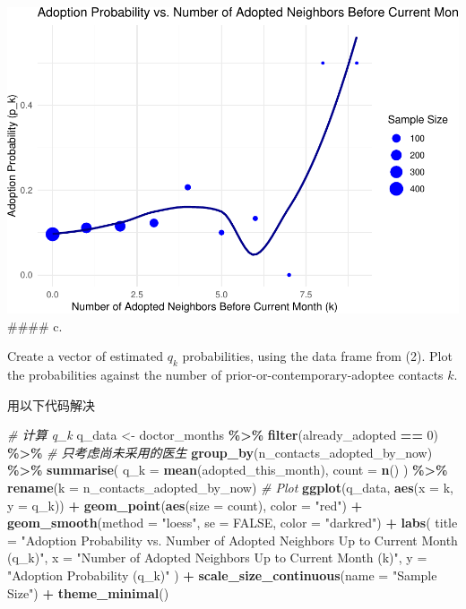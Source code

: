 \documentclass[
]{article}
\newenvironment{Shaded}{\begin{snugshade}}{\end{snugshade}}
\newcommand{\AttributeTok}[1]{\textcolor[rgb]{0.13,0.29,0.53}{#1}}
\newcommand{\CommentTok}[1]{\textcolor[rgb]{0.56,0.35,0.01}{\textit{#1}}}
\newcommand{\ConstantTok}[1]{\textcolor[rgb]{0.56,0.35,0.01}{#1}}
\newcommand{\DecValTok}[1]{\textcolor[rgb]{0.00,0.00,0.81}{#1}}
\newcommand{\FunctionTok}[1]{\textcolor[rgb]{0.13,0.29,0.53}{\textbf{#1}}}
\newcommand{\NormalTok}[1]{#1}
\newcommand{\OtherTok}[1]{\textcolor[rgb]{0.56,0.35,0.01}{#1}}
\newcommand{\SpecialCharTok}[1]{\textcolor[rgb]{0.81,0.36,0.00}{\textbf{#1}}}
\newcommand{\StringTok}[1]{\textcolor[rgb]{0.31,0.60,0.02}{#1}}
\begin{document}
\includegraphics{Homework-04_files/figure-latex/unnamed-chunk-3-1.pdf}
\#\#\#\# c.~

Create a vector of estimated \(q_k\) probabilities, using the data frame
from (2). Plot the probabilities against the number of
prior-or-contemporary-adoptee contacts \(k\).

用以下代码解决

\begin{Shaded}
\begin{Highlighting}[]
\CommentTok{\# 计算 q\_k}
\NormalTok{q\_data }\OtherTok{\textless{}{-}}\NormalTok{ doctor\_months }\SpecialCharTok{\%\textgreater{}\%}
\FunctionTok{filter}\NormalTok{(already\_adopted }\SpecialCharTok{==} \DecValTok{0}\NormalTok{) }\SpecialCharTok{\%\textgreater{}\%} \CommentTok{\# 只考虑尚未采用的医生}
\FunctionTok{group\_by}\NormalTok{(n\_contacts\_adopted\_by\_now) }\SpecialCharTok{\%\textgreater{}\%}
\FunctionTok{summarise}\NormalTok{(}
\AttributeTok{q\_k =} \FunctionTok{mean}\NormalTok{(adopted\_this\_month),}
\AttributeTok{count =} \FunctionTok{n}\NormalTok{()}
\NormalTok{) }\SpecialCharTok{\%\textgreater{}\%}
  \FunctionTok{rename}\NormalTok{(}\AttributeTok{k =}\NormalTok{ n\_contacts\_adopted\_by\_now)}
\CommentTok{\# Plot}
\FunctionTok{ggplot}\NormalTok{(q\_data, }\FunctionTok{aes}\NormalTok{(}\AttributeTok{x =}\NormalTok{ k, }\AttributeTok{y =}\NormalTok{ q\_k)) }\SpecialCharTok{+}
\FunctionTok{geom\_point}\NormalTok{(}\FunctionTok{aes}\NormalTok{(}\AttributeTok{size =}\NormalTok{ count), }\AttributeTok{color =} \StringTok{"red"}\NormalTok{) }\SpecialCharTok{+}
\FunctionTok{geom\_smooth}\NormalTok{(}\AttributeTok{method =} \StringTok{"loess"}\NormalTok{, }\AttributeTok{se =} \ConstantTok{FALSE}\NormalTok{, }\AttributeTok{color =} \StringTok{"darkred"}\NormalTok{) }\SpecialCharTok{+}
\FunctionTok{labs}\NormalTok{(}
\AttributeTok{title =} \StringTok{"Adoption Probability vs. Number of Adopted Neighbors Up to Current Month (q\_k)"}\NormalTok{,}
\AttributeTok{x =} \StringTok{"Number of Adopted Neighbors Up to Current Month (k)"}\NormalTok{,}
\AttributeTok{y =} \StringTok{"Adoption Probability (q\_k)"}
\NormalTok{) }\SpecialCharTok{+}
\FunctionTok{scale\_size\_continuous}\NormalTok{(}\AttributeTok{name =} \StringTok{"Sample Size"}\NormalTok{) }\SpecialCharTok{+}
\FunctionTok{theme\_minimal}\NormalTok{()}
\end{Highlighting}
\end{Shaded}
\end{document}
